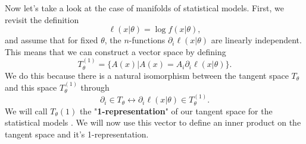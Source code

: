Now let's take a look at the case of manifolds of statistical models. First, we revisit the definition
\begin{equation}
	\ell(x|\theta) = \log f(x|\theta),
\end{equation}
and assume that for fixed $\theta$, the $n$-functions $\partial_i \ell(x|\theta)$ are linearly independent. This means that we can construct a vector space by defining \cite{AmarisLectureNotes}
\begin{equation}
	T_\theta^{(1)} = \{A(x) | A(x) = A_i \partial_i \ell(x|\theta)\}.
\end{equation}
We do this because there is a natural isomorphism between the tangent space $T_\theta$ and this space $T_\theta^{(1)}$ through \cite{AmarisLectureNotes}
\begin{equation}
	\partial_i \in T_\theta \leftrightarrow \partial_i \ell(x|\theta) \in T_\theta^{(1)}.
\end{equation}
We will call $T_\theta{(1)}$ the "\textbf{1-representation}" of our tangent space for the statistical models \cite{AmarisLectureNotes}. We will now use this vector to define an inner product on the tangent space and it's 1-representation.\\
